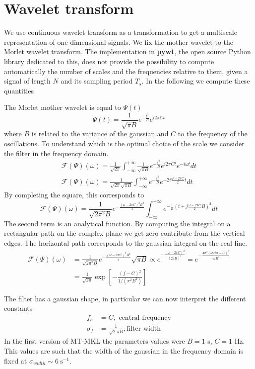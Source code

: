 \documentclass[a4paper]{article}
\begin{document}
\section{Wavelet transform}
We use continuous wavelet transform as a transformation to get a multiscale representation of one dimensional signals. We fix the mother wavelet to the Morlet wavelet transform. The implementation in \textbf{pywt}, the open source Python library dedicated to this, does not provide the possibility to compute automatically the number of scales and the frequencies relative to them, given a signal of length $N$ and its sampling period $T_s$. In the following we compute these quantities

The Morlet mother wavelet is equal to $\Psi(t)$
\begin{equation}
  \Psi(t) = \frac{1}{\sqrt{\pi B}} e^{-\frac{t^2}{B}}e^{i 2 \pi C t}
\end{equation}
where $B$ is related to the variance of the gaussian and $C$ to the frequency of the oscillations. To understand which is the optimal choice of the scale we consider the filter in the frequency domain.
\begin{align*}
\mathcal{F}(\Psi)(\omega) = \frac{1}{\sqrt{2\pi}}\int_{-\infty}^{+\infty} \frac{1}{\sqrt{\pi B}}e^{-\frac{t^2}{B}}e^{i 2 \pi C t} e^{-i\omega t}dt \\
\mathcal{F}(\Psi)(\omega) = \frac{1}{\sqrt{2\pi}\sqrt{\pi B}}\int_{-\infty}^{+\infty} e^{-\frac{t^2}{B}} e^{-2i\frac{\omega - 2 \pi C}{2} t}  dt
\end{align*}
By completing the square, this corresponds to
$$ \mathcal{F}(\Psi)(\omega) = \frac{1}{\sqrt{2\pi^2 B}} e^{-\frac{(\omega - 2\pi C)^2B^2}{4}}\int_{-\infty}^{+\infty} e^{-\frac{1}{B}\left(t + j\frac{\omega - 2\pi C}{2}B\right)^2}dt $$
The second term is an analytical function. By computing the integral on a rectangular path on the complex plane we get zero contribute from the vertical edges. The horizontal path corresponds to the gaussian integral on the real line.
\begin{align}
\mathcal{F}(\Psi)(\omega) &= \frac{1}{\sqrt{2\pi^2 B}} e^{-\frac{(\omega - 2\pi C)^2B^2}{4}}  \sqrt{\pi B} \propto  e^{-\frac{(\omega - 2\pi C)^2}{(2/B)^2}}  = e^{-\frac{4\pi^2(\omega/2\pi - C)^2}{4/B^2}} \\
&= \frac{1}{\sqrt{2\pi}}\exp\left[-\frac{(f-C)^2}{1/(\pi^2 B^2)}\right]
\end{align}

The filter has a gaussian shape, in particular we can now interpret the different constants
\begin{align*}
f_c & = C, \text{ central frequency}\\
\sigma_f & = \frac{1}{\sqrt{2}\pi B}, \text{filter width}
\end{align*}
In the first version of MT-MKL the parameters values were $B=1$ s, $C=1$ Hz.
This values are such that the width of the gaussian in the frequency domain is fixed at $\sigma_{width}\sim6\ \text{s}^{-1}$.
\end{document}
